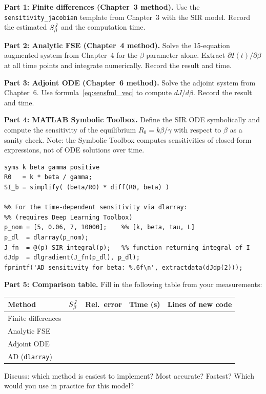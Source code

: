 \textbf{Part 1: Finite differences (Chapter~3 method).}
Use the \texttt{sensitivity\_jacobian} template from Chapter~3 with the
SIR model. Record the estimated $S_{\beta}^{J}$ and the computation time.

\textbf{Part 2: Analytic FSE (Chapter~4 method).}
Solve the 15-equation augmented system from Chapter~4 for the $\beta$
parameter alone. Extract $\partial I(t)/\partial\beta$ at all time points
and integrate numerically. Record the result and time.

\textbf{Part 3: Adjoint ODE (Chapter~6 method).}
Solve the adjoint system from Chapter~6. Use
formula~\eqref{eq:sensfml_vec} to compute $dJ/d\beta$.
Record the result and time.

\textbf{Part 4: MATLAB Symbolic Toolbox.}
Define the SIR ODE symbolically and compute the sensitivity
of the equilibrium $R_0 = k\beta/\gamma$ with respect to $\beta$
as a sanity check. Note: the Symbolic Toolbox computes sensitivities
of closed-form expressions, not of ODE solutions over time.

\begin{verbatim}
syms k beta gamma positive
R0   = k * beta / gamma;
SI_b = simplify( (beta/R0) * diff(R0, beta) )

%% For the time-dependent sensitivity via dlarray:
%% (requires Deep Learning Toolbox)
p_nom = [5, 0.06, 7, 10000];    %% [k, beta, tau, L]
p_dl  = dlarray(p_nom);
J_fn  = @(p) SIR_integral(p);   %% function returning integral of I
dJdp  = dlgradient(J_fn(p_dl), p_dl);
fprintf('AD sensitivity for beta: %.6f\n', extractdata(dJdp(2)));
\end{verbatim}

\textbf{Part 5: Comparison table.}
Fill in the following table from your measurements:

\begin{center}
\begin{tabular}{lcccc}
\toprule
Method & $S_{\beta}^{J}$ & Rel.\ error & Time (s) & Lines of new code \\
\midrule
Finite differences & & & & \\
Analytic FSE & & & & \\
Adjoint ODE & & & & \\
AD (\texttt{dlarray}) & & & & \\
\bottomrule
\end{tabular}
\end{center}

Discuss: which method is easiest to implement? Most accurate?
Fastest? Which would you use in practice for this model?

